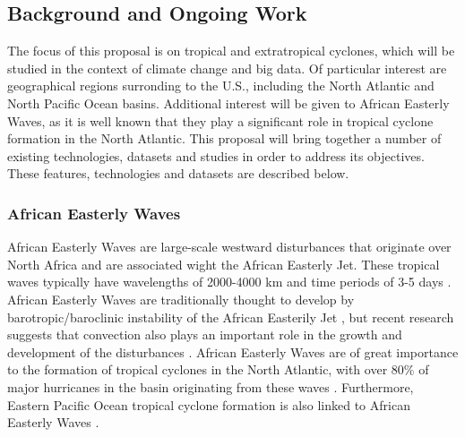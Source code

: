 \documentclass[11pt]{article}
\begin{document}

\subsection{Background and Ongoing Work} \label{sec:BackgroundOngoingWork}

The focus of this proposal is on tropical and extratropical cyclones, which will be studied in the context of climate change and big data.  Of particular interest are geographical regions surronding to the U.S., including the North Atlantic and North Pacific Ocean basins. Additional interest will be given to African Easterly Waves, as it is well known that they play a significant role in tropical cyclone formation in the North Atlantic. This proposal will bring together a number of existing technologies, datasets and studies in order to address its objectives.  These features, technologies and datasets are described below.

\subsubsection{African Easterly Waves}
African Easterly Waves are large-scale westward disturbances that originate over North Africa and are associated wight the African Easterly Jet. These tropical waves typically have wavelengths of 2000-4000 km and time periods of 3-5 days \citep{Burpee1974,Reed1977}. African Easterly Waves are traditionally thought to develop by barotropic/baroclinic instability of the African Easterily Jet \citep{Burpee1972}, but recent research suggests that convection also plays an important role in the growth and development of the disturbances \citep{Hall2006,Thorncroft2008,Hsieh&Cook2005,Berry&Thorncraft2012}. African Easterly Waves are of great importance to the formation of tropical cyclones in the North Atlantic, with over 80$\%$ of major hurricanes in the basin originating from these waves \citep{Landsea1993}. Furthermore, Eastern Pacific Ocean tropical cyclone formation is also linked to African Easterly Waves \citep{Avila&Pasch1995}. 
\end{document}
